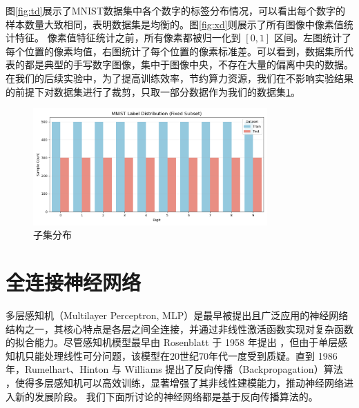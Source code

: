 \documentclass[12pt,a4paper]{article}
\begin{document}
图\ref{fig:td}展示了MNIST数据集中各个数字的标签分布情况，可以看出每个数字的样本数量大致相同，表明数据集是均衡的。图\ref{fig:xd}则展示了所有图像中像素值统计特征。
像素值特征统计之前，所有像素都被归一化到 $[0, 1]$ 区间。左图统计了每个位置的像素均值，右图统计了每个位置的像素标准差。可以看到，数据集所代表的都是典型的手写数字图像，集中于图像中央，不存在大量的偏离中央的数据。
在我们的后续实验中，为了提高训练效率，节约算力资源，我们在不影响实验结果的前提下对数据集进行了裁剪，只取一部分数据作为我们的数据集\ref{fig:sssss}。
\begin{figure}[H]
    \centering
    \includegraphics[width=0.8\textwidth]{../images/zjfb.png}
    \caption{子集分布}
    \label{fig:sssss}
\end{figure}
\section{全连接神经网络}
多层感知机（Multilayer Perceptron, MLP）是最早被提出且广泛应用的神经网络结构之一，其核心特点是各层之间全连接，并通过非线性激活函数实现对复杂函数的拟合能力。尽管感知机模型最早由 Rosenblatt 于 1958 年提出 \cite{Rosenblatt1958}，但由于单层感知机只能处理线性可分问题，该模型在20世纪70年代一度受到质疑。直到 1986 年，Rumelhart、Hinton 与 Williams 提出了反向传播（Backpropagation）算法 \cite{Rumelhart1986}，使得多层感知机可以高效训练，显著增强了其非线性建模能力，推动神经网络进入新的发展阶段。
我们下面所讨论的神经网络都是基于反向传播算法的。
\end{document}
